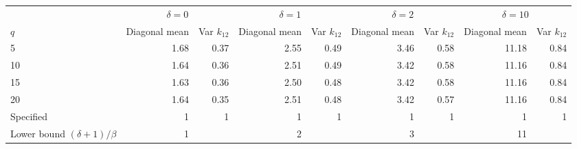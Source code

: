 \begin{tabular}{lrrrrrrrr}
\toprule
 & \multicolumn{2}{c}{$\delta=0$} & \multicolumn{2}{c}{$\delta=1$} & \multicolumn{2}{c}{$\delta=2$} & \multicolumn{2}{c}{$\delta=10$} \\
\cmidrule(lr){2-3}\cmidrule(lr){4-5}\cmidrule(lr){6-7}\cmidrule(lr){8-9}
$q$ & Diagonal mean & Var $k_{12}$ & Diagonal mean & Var $k_{12}$ & Diagonal mean & Var $k_{12}$ & Diagonal mean & Var $k_{12}$ \\
\midrule
5 & 1.68 & 0.37 & 2.55 & 0.49 & 3.46 & 0.58 & 11.18 & 0.84 \\
10 & 1.64 & 0.36 & 2.51 & 0.49 & 3.42 & 0.58 & 11.16 & 0.84 \\
15 & 1.63 & 0.36 & 2.50 & 0.48 & 3.42 & 0.58 & 11.16 & 0.84 \\
20 & 1.64 & 0.35 & 2.51 & 0.48 & 3.42 & 0.57 & 11.16 & 0.84 \\
\midrule
Specified & 1 & 1 & 1 & 1 & 1 & 1 & 1 & 1 \\
Lower bound $(\delta+1)/\beta$ & 1 &  & 2 &  & 3 &  & 11 &  \\
\bottomrule
\end{tabular}
